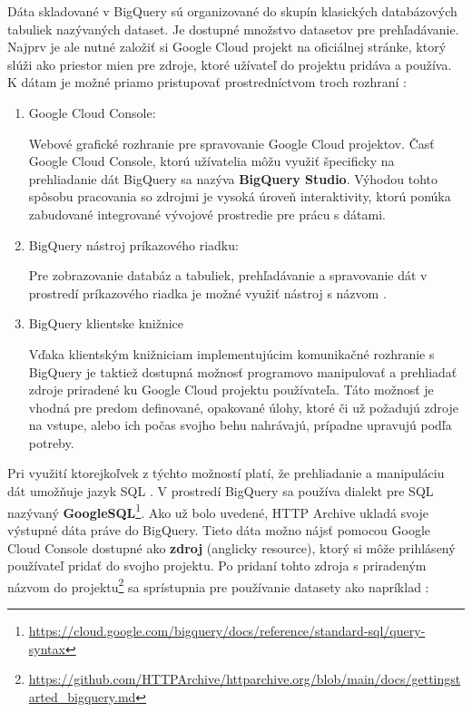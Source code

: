 Dáta skladované v BigQuery sú organizované do skupín klasických databázových tabuliek nazývaných dataset.
Je dostupné množstvo datasetov pre prehľadávanie.
Najprv je ale nutné založiť si Google Cloud projekt na oficiálnej stránke, ktorý slúži ako priestor mien pre zdroje, ktoré užívateľ do projektu pridáva a používa.
K dátam je možné priamo pristupovať prostredníctvom troch rozhraní \cite{google-cloud}:
\begin{enumerate}
    \item Google Cloud Console:

    Webové grafické rozhranie pre spravovanie Google Cloud projektov. 
    Časť Google Cloud Console, ktorú užívatelia môžu využiť špecificky na prehliadanie dát BigQuery sa nazýva \textbf{BigQuery Studio}.
    Výhodou tohto spôsobu pracovania so zdrojmi je vysoká úroveň interaktivity, ktorú ponúka zabudované integrované vývojové prostredie pre prácu s dátami. 

    \item BigQuery nástroj príkazového riadku:

    Pre zobrazovanie databáz a tabuliek, prehľadávanie a spravovanie dát v prostredí príkazového riadka je možné využiť nástroj s názvom . 
    
    \item BigQuery klientske knižnice

    Vďaka klientským knižniciam implementujúcim komunikačné rozhranie s BigQuery je taktiež dostupná možnosť programovo manipulovať a prehliadať zdroje priradené ku Google Cloud projektu používateľa.
    Táto možnosť je vhodná pre predom definované, opakované úlohy, ktoré či už požadujú zdroje na vstupe, alebo ich počas svojho behu nahrávajú, prípadne upravujú podľa potreby.
\end{enumerate}

Pri využití ktorejkoľvek z týchto možností platí, že prehliadanie a manipuláciu dát umožňuje jazyk SQL \cite{google-bq}.
V prostredí BigQuery sa používa dialekt pre SQL nazývaný \textbf{GoogleSQL}\footnote{\href{https://cloud.google.com/bigquery/docs/reference/standard-sql/query-syntax}{https://cloud.google.com/bigquery/docs/reference/standard-sql/query-syntax}}.
Ako už bolo uvedené, HTTP Archive ukladá svoje výstupné dáta práve do BigQuery.
Tieto dáta možno nájsť pomocou Google Cloud Console dostupné ako \textbf{zdroj} (anglicky resource), ktorý si môže prihlásený používateľ pridať do svojho projektu.
Po pridaní tohto zdroja s priradeným názvom  do projektu\footnote{\href{https://github.com/HTTPArchive/httparchive.org/blob/main/docs/gettingstarted\_bigquery.md}{https://github.com/HTTPArchive/httparchive.org/blob/main/docs/gettingstarted\_bigquery.md}} sa sprístupnia pre používanie datasety ako napríklad \cite{httparchive-repo}:

